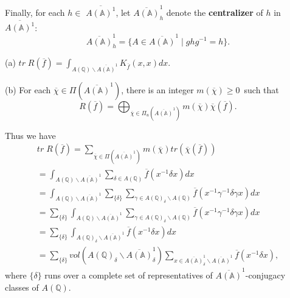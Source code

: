Finally, for each $h\in $ $\overline{A({\mathbb{A}})^1}$, let
$\overline{A({\mathbb{A}})}_h^1$ denote the \textbf{centralizer} of $h$
in $\overline{A({\mathbb{A}})^1}$: 
\begin{equation}\label{eq:3.13}
\overline{A({\mathbb{A}})}_h^1
=\{A\in \overline{A({\mathbb{A}})}^1\;|\;ghg^{-1}=h\}.
\end{equation}

\begin{theorem}\label{thm:3.8}
(a) $tr\;R(\overline{f})
=\int_{A({\mathbb{Q}})\backslash \overline{A({\mathbb{A}})}^1}
K_{\overline{f}}(x,x)dx.$

(b) For each $\overline{\chi }\in \Pi (\overline{A({\mathbb{A}})}^1)$, there is
an integer $m(\overline{\chi })\geq 0$\ such that 
\[
R(\overline{f})
=\bigoplus_{\overline{\chi }\in \Pi_u (\overline{A({\mathbb{A}})}^1)}
m(\overline{\chi })\overline{\chi }(\overline{f}).
\]
\end{theorem}

Thus we have 
\begin{equation}\label{eq:3.14}
\begin{array}{c}
tr\;R(\overline{f})
=\sum_{\overline{\chi }\in \Pi (\overline{A({\mathbb{A}})}^1)}
m(\overline{\chi })tr(\overline{\chi }(\overline{f})) \\ 
=\int_{A({\mathbb{Q}})\backslash \overline{A({\mathbb{A}})}^1}
\sum_{\delta\in A({\mathbb{Q}})}
\overline{f}(x^{-1}\delta x)dx \\ 
=\int_{A({\mathbb{Q}})\backslash \overline{A({\mathbb{A}})}^1}
\sum_{\{\delta \}}
\sum_{\gamma \in A({\mathbb{Q}})_\delta\backslash A({\mathbb{Q}})}
\overline{f}(x^{-1}\gamma ^{-1}\delta \gamma x)dx \\ 
=\sum_{\{\delta \}}
\int_{A({\mathbb{Q}})\backslash \overline{A({\mathbb{A}})}^1}
\sum_{\gamma \in A({\mathbb{Q}})_\delta \backslash A({\mathbb{Q}})}
\overline{f}(x^{-1}\gamma ^{-1}\delta \gamma x)dx \\ 
=\sum_{\{\delta \}}
\int_{A({\mathbb{Q}})_\delta \backslash \overline{A({\mathbb{A}})}^1}
\overline{f}(x^{-1}\delta x)dx \\ 
=\sum_{\{\delta \}}
vol(A({\mathbb{Q}})_\delta \backslash \overline{A({\mathbb{A}})}_\delta ^1)
\sum_{x\in \overline{A({\mathbb{A}})}_\delta ^1
\backslash \overline{A({\mathbb{A}})}^1}
\overline{f}(x^{-1}\delta x),
\end{array}
\end{equation}
where $\{\delta \}$ runs over a complete set of representatives of
$\overline{A({\mathbb{A}})}^1$-conjugacy classes of $A({\mathbb{Q}})$.

